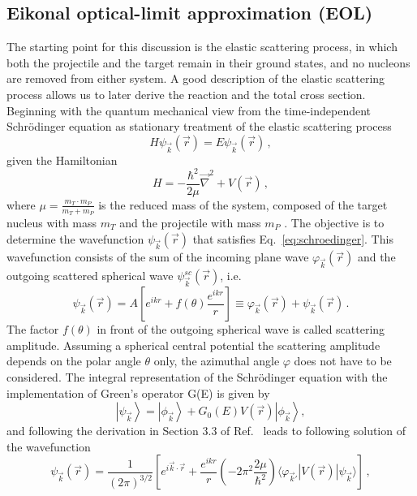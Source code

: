 \subsection{Eikonal optical-limit approximation (EOL)}\label{sec:eol}
The starting point for this discussion is the elastic scattering process, in which both the projectile and the target remain in their ground states, and no nucleons are removed from either system.
A good description of the elastic scattering process allows us to later derive the reaction and the total cross section.\\
Beginning with the quantum mechanical view from the time-independent Schr\"odinger equation as stationary treatment of the elastic scattering process
\begin{equation}\label{eq:schroedinger}
H\psi_{\vec{k}}(\vec{r}) = E\psi_{\vec{k}}(\vec{r}) \, ,
\end{equation}
given the Hamiltonian
\begin{equation}\label{eq:hamiltonian}
H = -\frac{\hbar^2}{2\mu} \vec{\nabla}^2 + V(\vec{r}) \, ,
\end{equation}
where $\mu = \frac{m_T \cdot m_P}{m_T+m_P}$ is the  reduced mass of the system, composed of the target nucleus with mass $m_T$ and the projectile with mass $m_P$ .
The objective is to determine  the wavefunction $\psi_{\vec{k}}(\vec{r})$ that satisfies Eq.~\ref{eq:schroedinger}. This wavefunction consists of the sum of the incoming plane wave $\varphi_{\vec{k}}(\vec{r})$ and the outgoing scattered spherical wave $\psi^{sc}_{\vec{k}}(\vec{r})$, i.e.
\begin{equation}\label{eq:tot_wave}
\psi_{\vec{k}}(\vec{r}) = A [e^{ikr} + f(\theta) \frac{e^{ikr}}{r}] \equiv \varphi_{\vec{k}}(\vec{r}) + \psi_{\vec{k}}(\vec{r}) \, .
\end{equation}
The factor $f(\theta)$ in front of the outgoing spherical wave is called scattering amplitude. Assuming a spherical central potential the scattering amplitude depends on the polar angle $\theta$ only, the azimuthal angle $\varphi$ does not have to be considered. 
The integral representation of the Schr\"odinger equation with the implementation of Green's operator G(E) is given by
$$
\left| \psi_{\vec{k}} \right\rangle = \left| \phi_{\vec{k}} \right\rangle + G_0(E)V(\vec{r}) \left| \phi_{\vec{k}} \right\rangle,
$$
and following the derivation in Section 3.3 of Ref.~\cite{bertulani2019introduction} leads to following solution of the wavefunction
\begin{equation}
\psi_{\vec{k}}(\vec{r}) = \frac{1}{(2\pi)^{3/2}} \left[ e^{i\vec{k}\cdot \vec{r}} + \frac{e^{ikr}}{r} \left( -2\pi^2 \frac{2\mu}{\hbar^2} \right) \langle \varphi_{\vec{k}'} | V(\vec{r}) | \psi_{\vec{k}} \rangle \right] \, ,
\end{equation}
